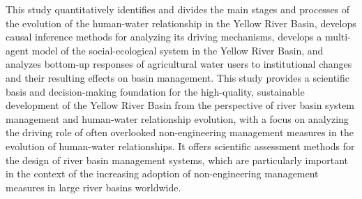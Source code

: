 \begin{eabstract}
  This study quantitatively identifies and divides the main stages and processes of the evolution of the human-water relationship in the Yellow River Basin, develops causal inference methods for analyzing its driving mechanisms, develops a multi-agent model of the social-ecological system in the Yellow River Basin, and analyzes bottom-up responses of agricultural water users to institutional changes and their resulting effects on basin management. This study provides a scientific basis and decision-making foundation for the high-quality, sustainable development of the Yellow River Basin from the perspective of river basin system management and human-water relationship evolution, with a focus on analyzing the driving role of often overlooked non-engineering management measures in the evolution of human-water relationships. It offers scientific assessment methods for the design of river basin management systems, which are particularly important in the context of the increasing adoption of non-engineering management measures in large river basins worldwide.
\end{eabstract}



